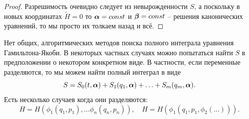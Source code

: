\begin{proof}
    Разрешимость очевидно следует из невырожденности $S$, а поскольку в новых координатах $\tilde{H} = 0$ то $\boldsymbol{\alpha} = const$ и $\boldsymbol{\beta} = const$ -- решения канонических уравнений, то мы просто их толкаем назад и всё.
\end{proof}
Нет общих, алгоритмических методов поиска полного интеграла уравнения Гамильтона-Якоби.
В некоторых частных случаях можно попытаться найти $S$ в предположении о некотором конкретном виде.
В частности, если переменные разделяются, то мы можем найти полный интеграл в виде
\[
    S = S_0(t, \boldsymbol{\alpha}) + S_1(q_1, \boldsymbol{\alpha}) + \ldots + S_{m}(q_m, \boldsymbol{\alpha}).
\]
Есть несколько случаев когда они разделяются:
\[
    H = H(\phi_1(q_1, p_1), \ldots \phi_n(q_n, p_n)), \quad H = H(\phi_1(q_1, p_1, \phi_2(\ldots))).
\]